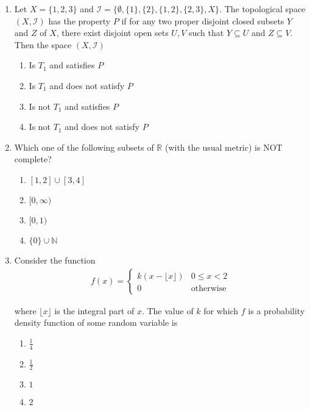 \documentclass[journal]{IEEEtran}
\numberwithin{equation}{enumi}
\numberwithin{figure}{enumi}
\begin{document}
\begin{enumerate}
\item
Let $X = \{1,2,3\}$ and $\mathcal{I} = \{\emptyset, \{1\}, \{2\}, \{1,2\}, \{2,3\}, X\}$. The topological space $(X, \mathcal{I})$ has the property $P$ if for any two proper disjoint closed subsets $Y$ and $Z$ of $X$, there exist disjoint open sets $U, V$ such that $Y \subseteq U$ and $Z \subseteq V$. Then the space $(X, \mathcal{I})$
\hfill{}
\begin{multicols}{2}
\begin{enumerate}
    \item Is $T_1$ and satisfies $P$
    \item Is $T_1$ and does not satisfy $P$
    \item Is not $T_1$ and satisfies $P$
    \item Is not $T_1$ and does not satisfy $P$
\end{enumerate}
\end{multicols}

\item
Which one of the following subsets of $\mathbb{R}$ (with the usual metric) is NOT complete?
\hfill{}
\begin{multicols}{4}
\begin{enumerate}
    \item $[1,2] \cup [3,4]$
    \item $[0, \infty)$
    \item $[0,1)$
    \item $\{0\} \cup \mathbb{N}$
\end{enumerate}
\end{multicols}

\item
Consider the function
\begin{align}
    f(x) = 
\begin{cases}
k(x - \lfloor x \rfloor) & 0 \leq x < 2 \\
0 & \text{otherwise}
\end{cases}
\end{align}

where $\lfloor x \rfloor$ is the integral part of $x$. The value of $k$ for which $f$ is a probability density function of some random variable is
\hfill{}
\begin{multicols}{4}
\begin{enumerate}
    \item $\frac{1}{4}$
    \item $\frac{1}{2}$
    \item $1$
    \item $2$
\end{enumerate}
\end{multicols}


\end{enumerate}
\end{document}
